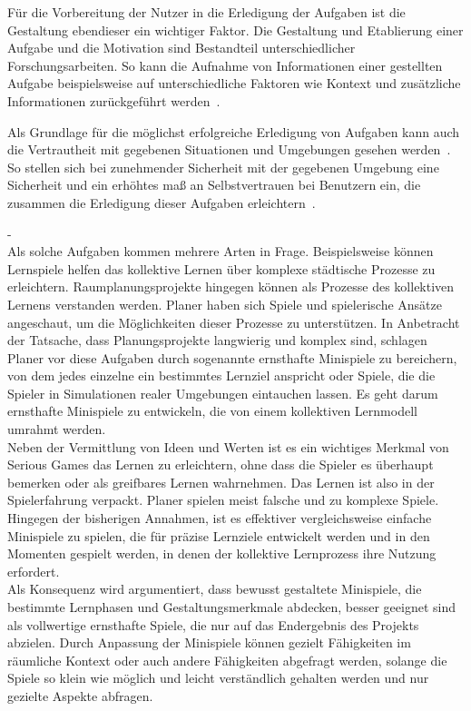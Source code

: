Für die Vorbereitung der Nutzer in die Erledigung der Aufgaben ist die Gestaltung ebendieser ein wichtiger Faktor. Die Gestaltung und Etablierung einer Aufgabe und die Motivation sind Bestandteil unterschiedlicher Forschungsarbeiten. 
So kann die Aufnahme von Informationen einer gestellten Aufgabe beispielsweise auf unterschiedliche Faktoren wie Kontext und zusätzliche Informationen zurückgeführt werden~\cite{salancik1978social, van2002blueprints, hollnagel2003handbook}. 

Als Grundlage für die möglichst erfolgreiche Erledigung von Aufgaben kann auch die Vertrautheit mit gegebenen Situationen und Umgebungen gesehen werden~\cite{scott1966activation}. So stellen sich bei zunehmender Sicherheit mit der gegebenen Umgebung eine Sicherheit und ein erhöhtes maß an Selbstvertrauen bei Benutzern ein, die zusammen die Erledigung dieser Aufgaben erleichtern~\cite{scott1966activation}. 

-\cite{devisch2018mini}\\ 
Als solche Aufgaben kommen mehrere Arten in Frage. Beispielsweise können Lernspiele helfen das kollektive Lernen über komplexe städtische Prozesse zu erleichtern. Raumplanungsprojekte hingegen können als Prozesse des kollektiven Lernens verstanden werden. Planer haben sich Spiele und spielerische Ansätze angeschaut, um die Möglichkeiten dieser Prozesse zu unterstützen. In Anbetracht der Tatsache, dass Planungsprojekte langwierig  und komplex sind, schlagen Planer vor diese Aufgaben durch sogenannte ernsthafte Minispiele zu bereichern, von dem jedes einzelne ein bestimmtes Lernziel anspricht oder Spiele, die die Spieler in Simulationen realer Umgebungen eintauchen lassen. Es geht darum ernsthafte Minispiele zu entwickeln, die von einem kollektiven Lernmodell umrahmt werden.\\ 
Neben der Vermittlung von Ideen und Werten ist es ein wichtiges Merkmal von Serious Games das Lernen zu erleichtern, ohne dass die Spieler es überhaupt bemerken oder als greifbares Lernen wahrnehmen. Das Lernen ist also in der Spielerfahrung verpackt. Planer spielen meist falsche und zu komplexe Spiele. Hingegen der bisherigen Annahmen, ist es effektiver vergleichsweise einfache Minispiele zu spielen, die für präzise Lernziele entwickelt werden und in den Momenten gespielt werden, in denen der kollektive Lernprozess ihre Nutzung erfordert.\\
Als Konsequenz wird argumentiert, dass bewusst gestaltete Minispiele, die bestimmte Lernphasen und Gestaltungsmerkmale abdecken, besser geeignet sind als vollwertige ernsthafte Spiele, die nur auf das Endergebnis des Projekts abzielen. Durch Anpassung der Minispiele können gezielt Fähigkeiten im räumliche Kontext oder auch andere Fähigkeiten abgefragt werden, solange die Spiele so klein wie möglich und leicht verständlich gehalten werden und nur gezielte Aspekte abfragen.

